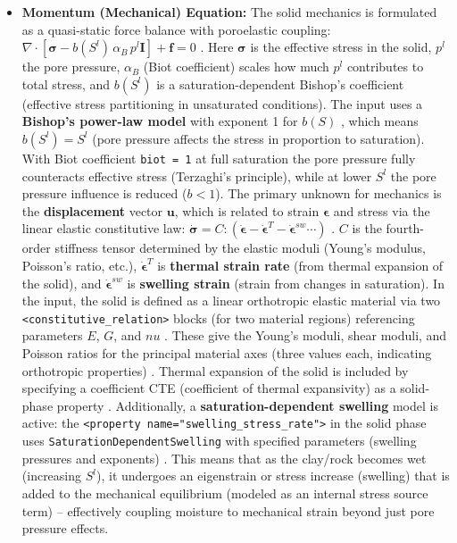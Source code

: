 \documentclass[10pt,a4paper]{article}
\begin{document}
\begin{itemize}
    \item \textbf{Momentum (Mechanical) Equation:} The solid mechanics is formulated as a quasi-static force balance with poroelastic coupling: $\nabla\cdot[\boldsymbol{\sigma} - b(S^l)\,\alpha_B\,p^l \mathbf{I}] + \mathbf{f} = 0$ \cite{ogs:trm, doc:trm_gov_eq}. Here $\boldsymbol{\sigma}$ is the effective stress in the solid, $p^l$ the pore pressure, $\alpha_B$ (Biot coefficient) scales how much $p^l$ contributes to total stress, and $b(S^l)$ is a saturation-dependent Bishop's coefficient (effective stress partitioning in unsaturated conditions). The input uses a \textbf{Bishop's power-law model} with exponent 1 for $b(S)$ \cite{file:04_2_media_twophase}, which means $b(S^l)=S^l$ (pore pressure affects the stress in proportion to saturation). With Biot coefficient \texttt{biot = 1} \cite{file:03_parameters_TRM} at full saturation the pore pressure fully counteracts effective stress (Terzaghi's principle), while at lower $S^l$ the pore pressure influence is reduced ($b<1$). The primary unknown for mechanics is the \textbf{displacement} vector $\mathbf{u}$, which is related to strain $\boldsymbol{\epsilon}$ and stress via the linear elastic constitutive law: $\dot{\boldsymbol{\sigma}} = C : (\dot{\boldsymbol{\epsilon}} - \dot{\boldsymbol{\epsilon}}^T - \dot{\boldsymbol{\epsilon}}^{sw} \cdots)$ \cite{ogs:trm}. $C$ is the fourth-order stiffness tensor determined by the elastic moduli (Young's modulus, Poisson's ratio, etc.), $\dot{\boldsymbol{\epsilon}}^T$ is \textbf{thermal strain rate} (from thermal expansion of the solid), and $\dot{\boldsymbol{\epsilon}}^{sw}$ is \textbf{swelling strain} (strain from changes in saturation). In the input, the solid is defined as a linear orthotropic elastic material via two \texttt{<constitutive\_relation>} blocks (for two material regions) referencing parameters $E$, $G$, and $nu$ \cite{file:01_processes_TRM}. These give the Young's moduli, shear moduli, and Poisson ratios for the principal material axes (three values each, indicating orthotropic properties) \cite{file:03_parameters_TRM}. Thermal expansion of the solid is included by specifying a coefficient CTE (coefficient of thermal expansivity) as a solid-phase property \cite{file:04_media_TRM}. Additionally, a \textbf{saturation-dependent swelling} model is active: the \texttt{<property name="swelling\_stress\_rate">} in the solid phase uses \texttt{SaturationDependentSwelling} with specified parameters (swelling pressures and exponents) \cite{file:04_media_TRM, file:trm_medium_phase_prop}. This means that as the clay/rock becomes wet (increasing $S^l$), it undergoes an eigenstrain or stress increase (swelling) that is added to the mechanical equilibrium (modeled as an internal stress source term) -- effectively coupling moisture to mechanical strain beyond just pore pressure effects.
\end{itemize}
\end{document}
